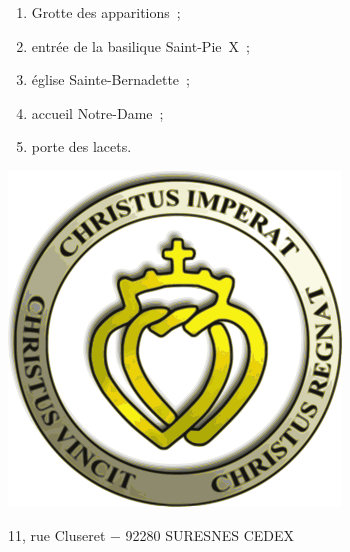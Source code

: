 \documentclass[%
a5paper%
,11pt%
,DIV=15%
,titlepage=on%
,headings=optiontoheadandtoc%
,headings=small%
,parskip=false%
,openany%
]{scrbook}
\begin{document}
\vfill
{\centering\parbox{.6\textwidth}{%
\begin{enumerate}
\item Grotte des apparitions ;
\item entrée de la basilique Saint-Pie X ;
\item église Sainte-Bernadette ;
\item accueil Notre-Dame ;
\item porte des lacets.
\end{enumerate}%
}\par
}
\vfill
\clearpage

{\thispagestyle{empty}\centering
{}

\includegraphics[width=.3\textwidth]{img/fsspx}


\footnotesize 11, rue Cluseret − 92280 SURESNES CEDEX\par}
\end{document}
